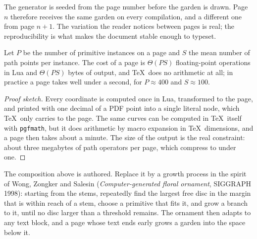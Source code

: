 \begin{remark}
The generator is seeded from the page number before the garden is drawn. Page $n$
therefore receives the same garden on every compilation, and a different one from page
$n+1$. The variation the reader notices between pages is real; the reproducibility is what
makes the document stable enough to typeset.
\end{remark}

\begin{proposition}
Let $P$ be the number of primitive instances on a page and $S$ the mean number of path
points per instance. The cost of a page is $\Theta(PS)$ floating-point operations in Lua and
$\Theta(PS)$ bytes of output, and \TeX\ does no arithmetic at all; in practice a page takes
well under a second, for $P\approx 400$ and $S\approx 100$.
\end{proposition}

\begin{proof}[Proof sketch]
Every coordinate is computed once in Lua, transformed to the page, and printed with one
decimal of a PDF point into a single literal node, which \TeX\ only carries to the page.
The same curves can be computed in \TeX\ itself with \texttt{pgfmath}, but it does
arithmetic by macro expansion in \TeX\ dimensions, and a page then takes about a minute. The
size of the output is the real constraint: about
three megabytes of path operators per page, which compress to under one.
\end{proof}

\begin{exercise}
The composition above is authored. Replace it by a growth process in the spirit of Wong,
Zongker and Salesin (\emph{Computer-generated floral ornament}, SIGGRAPH 1998): starting
from the stems, repeatedly find the largest free disc in the margin that is within reach of
a stem, choose a primitive that fits it, and grow a branch to it, until no disc larger than
a threshold remains. The ornament then adapts to any text block, and a page whose text
ends early grows a garden into the space below it.
\end{exercise}
